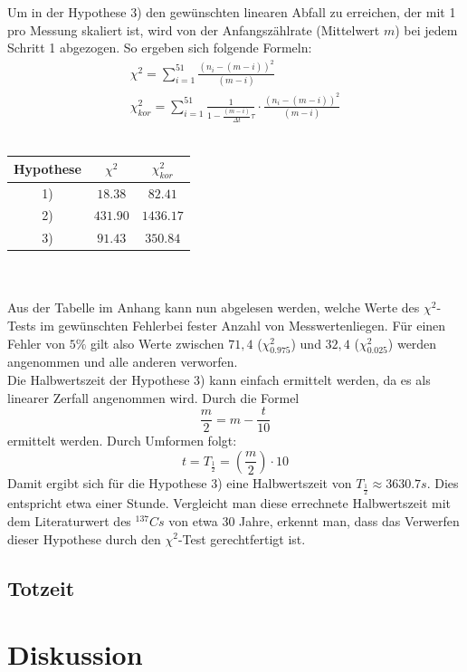 \documentclass{article}
\begin{document}
	\noindent Um in der Hypothese 3) den gewünschten linearen Abfall zu erreichen, der mit 1 pro Messung skaliert ist, wird von der Anfangszählrate (Mittelwert $m$) bei jedem Schritt 1 abgezogen. So ergeben sich folgende Formeln:
	\begin{gather}
	\chi^2=\sum_{i=1}^{51}\frac{\left(n_i-(m-i)\right)^2}{(m-i)}\\
	\chi_{kor}^2=\sum_{i=1}^{51}{\frac{1}{1-\frac{(m-i)}{\Delta t}\tau}\cdot\frac{\left(n_i-(m-i)\right)^2}{(m-i)}}
	\end{gather}
	\\
	\begin{center}
	\begin{tabular}{|c|c|c|}
		\hline
		Hypothese & $\chi^2$ & $\chi_{kor}^2$\\
		\hline\hline
		1) & $18.38$ & $82.41$\\
		\hline
		2) & $431.90$ & $1436.17$\\
		\hline
		3) & $91.43$ & $350.84$\\
		\hline
	\end{tabular}
	\end{center}
	\noindent
	\\\\Aus der Tabelle im Anhang kann nun abgelesen werden, welche Werte des $\chi^2$-Tests im gewünschten Fehlerbei fester Anzahl von Messwertenliegen. Für einen Fehler von $5\%$ gilt also Werte zwischen $71,4$ ($\chi_{0.975}^2$) und $32,4$ ($\chi_{0.025}^2$) werden angenommen und alle anderen verworfen.\\
	Die Halbwertszeit der Hypothese 3) kann einfach ermittelt werden, da es als linearer Zerfall angenommen wird. Durch die Formel \[\frac{m}{2}=m-\frac{t}{10}\] ermittelt werden. Durch Umformen folgt:
	\begin{equation}
	t=T_\frac{1}{2}=\left(\frac{m}{2}\right)\cdot10
	\end{equation}
	Damit ergibt sich für die Hypothese 3) eine Halbwertszeit von $T_\frac{1}{2}\approx3630.7s$. Dies entspricht etwa einer Stunde. Vergleicht man diese errechnete Halbwertszeit mit dem Literaturwert des $^{137}Cs$ von etwa 30 Jahre, erkennt man, dass das Verwerfen dieser Hypothese durch den $\chi^2$-Test gerechtfertigt ist.
	\subsection{Totzeit}
	\newpage
	\section{Diskussion}
\end{document}
